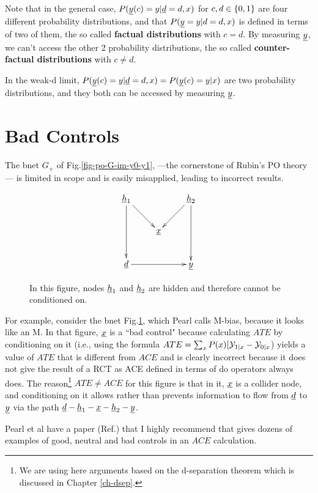 Note that in the general case,
$P({\underline{y}}(c)=y|{\underline{d}}=d, x)$
for $c, d\in \{0,1\}$
are four 
different probability 
distributions,
and that 
$P({\underline{y}}=y|d=d,x)$
is defined in terms
of two of them, the
so called {\bf factual
distributions} with $c=d$.
By measuring ${\underline{y}}$,
we can't access the other
2 probability distributions,
the so called {\bf counter-factual
distributions}
with $c\neq d$.

In the weak-d limit, 
$P({\underline{y}}(c)=y|{\underline{d}}=d, x
)=P({\underline{y}}(c)=y|x)$ are 
two probability
distributions, 
and they both
can be accessed 
by measuring ${\underline{y}}$.

\section{Bad Controls}

The bnet $G_+$
of Fig.\ref{fig-po-G-im-y0-y1}, 
---the cornerstone of Rubin's 
PO theory--- is limited in scope
and is easily
misapplied, leading
to incorrect results.


\begin{figure}
$$
\xymatrix{
\rvh_1 \ar[dd]\ar[dr]
&
& \rvh_2  \ar[dd]\ar[dl]
\\
& \rvx
\\
\rvd \ar[rr]
&&\rvy
}$$
\caption{In this figure,
nodes ${\underline{h}}_1$
and ${\underline{h}}_2$ are 
hidden and therefore
cannot be conditioned on.}
\label{fig-po--m-bias}
\end{figure}

For example, 
consider the 
bnet Fig.\ref{fig-po--m-bias},
which  Pearl calls M-bias,
because it looks like an M.
In that figure, 
${\underline{x}}$
is a ``bad control"
because 
calculating
$ATE$ by conditioning on it
(i.e., using the formula
$ATE=\sum_x
 P(x)[{\cal Y}_{1|x}-{\cal Y}_{0|x}$)
yields a value of $ATE$
that is different from
$ACE$
and is clearly 
incorrect because it does 
not give the result of a RCT
as ACE defined
in terms of do operators 
always does.
The reason\footnote{We are
using here arguments 
based on the d-separation 
theorem 
which is discussed in Chapter 
\ref{ch-dsep}.} $ATE\neq ACE$
for this figure
is that in it,
${\underline{x}}$ is 
a collider node,
and conditioning 
on it allows
rather than
prevents information
to flow from ${\underline{d}}$
to ${\underline{y}}$
via the path 
${\underline{d}}-{\underline{h}}_1-{\underline{x}}-{\underline{h}}_2-{\underline{y}}$.

Pearl et al have a paper
(Ref.\cite{pearl-good-neutral-bad})
that I highly recommend
that gives dozens of examples
of good, neutral and 
bad controls
in an $ACE$ calculation.





